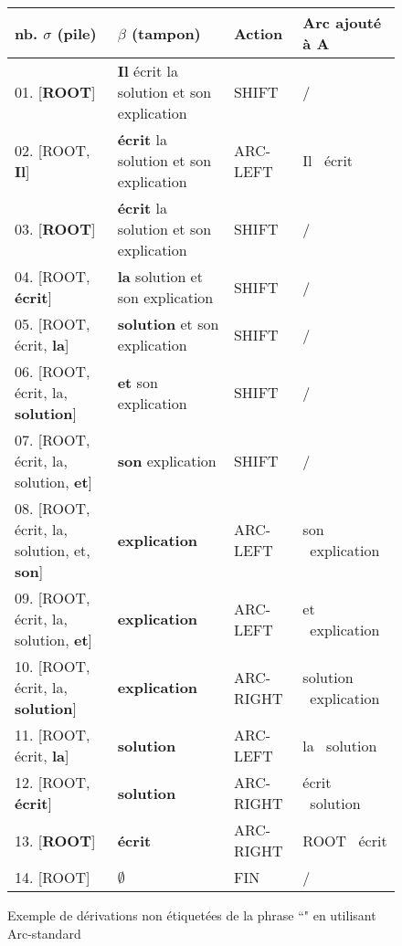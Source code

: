 \documentclass{KodeBook}
\begin{document}
\begin{figure}[ht]
	\centering\footnotesize
	\begin{tabular}{llll}
		\hline\hline
		nb. $\sigma$ (pile) & $\beta$ (tampon) & Action & Arc ajouté à A \\
		\hline
		01. [\textbf{ROOT}] & \textbf{Il} écrit la solution et son explication & SHIFT & / \\
		02. [ROOT, \textbf{Il}] & \textbf{écrit} la solution et son explication & ARC-LEFT & Il \textleftarrow\ écrit\\
		03. [\textbf{ROOT}] & \textbf{écrit} la solution et son explication & SHIFT & / \\
		04. [ROOT, \textbf{écrit}] & \textbf{la} solution et son explication & SHIFT & / \\
		05. [ROOT, écrit, \textbf{la}] & \textbf{solution} et son explication & SHIFT & / \\
		06. [ROOT, écrit, la, \textbf{solution}] & \textbf{et} son explication & SHIFT & / \\
		07. [ROOT, écrit, la, solution, \textbf{et}] & \textbf{son} explication & SHIFT & / \\
		08. [ROOT, écrit, la, solution, et, \textbf{son}] & \textbf{explication} & ARC-LEFT & son \textleftarrow\ explication\\
		09. [ROOT, écrit, la, solution, \textbf{et}] & \textbf{explication} & ARC-LEFT & et \textleftarrow\ explication\\
		10. [ROOT, écrit, la, \textbf{solution}] & \textbf{explication} & ARC-RIGHT & solution \textrightarrow\ explication\\
		11. [ROOT, écrit, \textbf{la}] & \textbf{solution} & ARC-LEFT & la \textleftarrow\ solution\\
		12. [ROOT, \textbf{écrit}] & \textbf{solution} & ARC-RIGHT & écrit \textrightarrow\ solution\\
		13. [\textbf{ROOT}] & \textbf{écrit} & ARC-RIGHT & ROOT \textrightarrow\ écrit\\
		14. [ROOT] & $\emptyset$ & FIN & / \\
		\hline\hline
	\end{tabular}
	\caption[Exemple de dérivations non étiquetées en utilisant Arc-standard]{Exemple de dérivations non étiquetées de la phrase ``" en utilisant Arc-standard\label{fig:arc-standard-exp}}
\end{figure}
\end{document}
